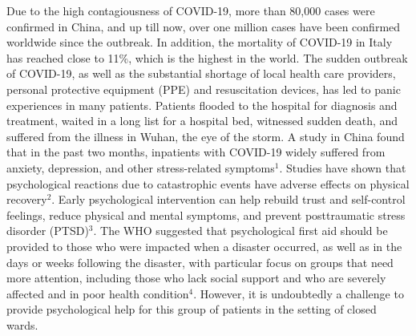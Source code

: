 \documentclass[
]{article}
\begin{document}
\newpage

Due to the high contagiousness of COVID-19, more than 80,000 cases were confirmed in China, and up till now, over one million cases have been confirmed worldwide since the outbreak. In addition, the mortality of COVID-19 in Italy has reached close to 11\%, which is the highest in the world. The sudden outbreak of COVID-19, as well as the substantial shortage of local health care providers, personal protective equipment (PPE) and resuscitation devices, has led to panic experiences in many patients. Patients flooded to the hospital for diagnosis and treatment, waited in a long list for a hospital bed, witnessed sudden death, and suffered from the illness in Wuhan, the eye of the storm. A study in China found that in the past two months, inpatients with COVID-19 widely suffered from anxiety, depression, and other stress-related symptoms$^1$. Studies have shown that psychological reactions due to catastrophic events have adverse effects on physical recovery$^2$. Early psychological intervention can help rebuild trust and self-control feelings, reduce physical and mental symptoms, and prevent posttraumatic stress disorder (PTSD)$^3$. The WHO suggested that psychological first aid should be provided to those who were impacted when a disaster occurred, as well as in the days or weeks following the disaster, with particular focus on groups that need more attention, including those who lack social support and who are severely affected and in poor health condition$^4$. However, it is undoubtedly a challenge to provide psychological help for this group of patients in the setting of closed wards.
\end{document}
